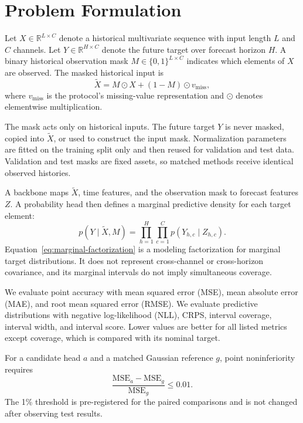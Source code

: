 \section{Problem Formulation}
\label{sec:problem}

Let $X \in \mathbb{R}^{L \times C}$ denote a historical multivariate sequence with input length $L$ and $C$ channels. Let $Y \in \mathbb{R}^{H \times C}$ denote the future target over forecast horizon $H$. A binary historical observation mask $M \in \{0,1\}^{L \times C}$ indicates which elements of $X$ are observed. The masked historical input is
\begin{equation}
    \widetilde{X} = M \odot X + (1-M) \odot v_{\mathrm{miss}},
    \label{eq:masked-input}
\end{equation}
where $v_{\mathrm{miss}}$ is the protocol's missing-value representation and $\odot$ denotes elementwise multiplication.

The mask acts only on historical inputs. The future target $Y$ is never masked, copied into $\widetilde{X}$, or used to construct the input mask. Normalization parameters are fitted on the training split only and then reused for validation and test data. Validation and test masks are fixed assets, so matched methods receive identical observed histories.

A backbone maps $\widetilde{X}$, time features, and the observation mask to forecast features $Z$. A probability head then defines a marginal predictive density for each target element:
\begin{equation}
    p(Y \mid \widetilde{X}, M)
    = \prod_{h=1}^{H}\prod_{c=1}^{C}
      p\!\left(Y_{h,c}\mid Z_{h,c}\right).
    \label{eq:marginal-factorization}
\end{equation}
Equation~\ref{eq:marginal-factorization} is a modeling factorization for marginal target distributions. It does not represent cross-channel or cross-horizon covariance, and its marginal intervals do not imply simultaneous coverage.

We evaluate point accuracy with mean squared error (MSE), mean absolute error (MAE), and root mean squared error (RMSE). We evaluate predictive distributions with negative log-likelihood (NLL), CRPS, interval coverage, interval width, and interval score. Lower values are better for all listed metrics except coverage, which is compared with its nominal target.

For a candidate head $a$ and a matched Gaussian reference $g$, point noninferiority requires
\begin{equation}
    \frac{\mathrm{MSE}_{a}-\mathrm{MSE}_{g}}{\mathrm{MSE}_{g}}
    \leq 0.01.
    \label{eq:point-gate}
\end{equation}
The 1\% threshold is pre-registered for the paired comparisons and is not changed after observing test results.
